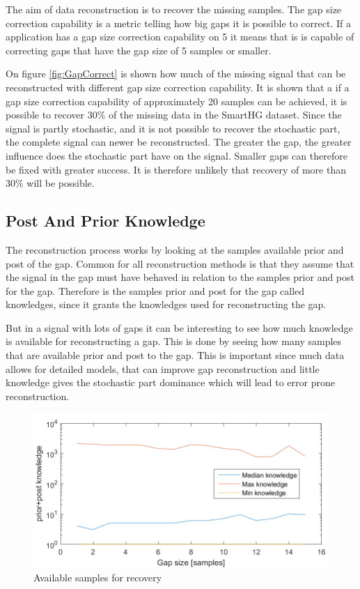 The aim of data reconstruction is to recover the missing samples. The gap size correction capability is a metric telling how big gaps it is possible to correct. If a application has a gap size correction capability on 5 it means that is is capable of correcting gaps that have the gap size of 5 samples or smaller. 

On figure \ref{fig:GapCorrect} is shown how much of the missing signal that can be reconstructed with different gap size correction capability. It is shown that a if a gap size correction capability of approximately 20 samples can be achieved, it is possible to recover $30\%$ of the missing data in the SmartHG dataset. Since the signal is partly stochastic, and it is not possible to recover the stochastic part, the complete signal can newer be reconstructed. The greater the gap, the greater influence does the stochastic part have on the signal. Smaller gaps can therefore be fixed with greater success. It is therefore unlikely that recovery of more than $30\%$ will be possible. 

\subsection{Post And Prior Knowledge}
The reconstruction process works by looking at the samples available prior and post of the gap. Common for all reconstruction methods is that they assume that the signal in the gap must have behaved in relation to the samples prior and post for the gap. Therefore is the samples prior and post for the gap called knowledges, since it grants the knowledges used for reconstructing the gap. 

But in a signal with lots of gaps it can be interesting to see how much knowledge is available for reconstructing a gap. This is done by seeing how many samples that are available prior and post to the gap. This is important since much data allows for detailed models, that can improve gap reconstruction and little knowledge gives the stochastic part dominance which will lead to error prone reconstruction. 

\begin{figure}[H]
\centering
\includegraphics[width=0.7\linewidth]{billeder/GapInfo2.png}\caption{Available samples for recovery}
\label{fig:PAF}
\end{figure}

